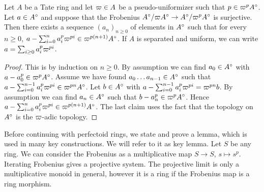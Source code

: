 \begin{lemma}
Let $A$ be a Tate ring and let $\varpi\in A$ be a pseudo-uniformizer such that $p\in\varpi^{p}A{^{\circ}}$. Let $a\in A{^{\circ}}$ and suppose that the Frobenius $A{^{\circ}}/\varpi A{^{\circ}}\to A{^{\circ}}/\varpi^pA{^{\circ}}$ is surjective.
Then there exists a sequence $(a_n)_{n\geq0}$ of elements in $A{^{\circ}}$ such that  for every $n\geq0$,
 $a-\sum_{i=0}^{n}a_i^p\varpi^{pi}\in\varpi^{p(n+1)}A{^{\circ}}$. 
If $A$ is separated and uniform, we can write $a=\sum_{i\geq0}a_i^p\varpi^{pi}$.
\end{lemma}
\begin{proof}
This is by induction on $n\geq0$. By assumption we can find $a_0\in A{^{\circ}}$ with $a-a_0^p\in\varpi^pA{^{\circ}}$.
Assume we have found $a_0\dots a_{n-1}\in A{^{\circ}}$ such that $a-\sum_{i=0}^{n-1}a_i^p\varpi^{pi}\in\varpi^{pn}A{^{\circ}}$. Let $b\in A{^{\circ}}$ with $a-\sum_{i=0}^{n-1}a_i^p\varpi^{pi} = \varpi^{pn}b$.
By assumption we can find $a_n\in A{^{\circ}}$ such that $b-a_n^p\in\varpi^pA{^{\circ}}$.
Hence $a-\sum_{i=0}^{n}a_i^p\varpi^{pi}\in\varpi^{p(n+1)}A{^{\circ}}$.
The last claim uses the fact that the topology on $A{^{\circ}}$
is the $\varpi$-adic topology.
\end{proof}

Before continuing with perfectoid rings, we state and prove a lemma, which is used in many key constructions. We will refer to it as key lemma.
Let $S$ be any ring. We can consider the Frobenius as a multiplicative map $S\to S$, $s\mapsto s^p$. Iterating Frobenius gives a projective system. The projective limit is only a multiplicative monoid in general, however it is a ring if the Frobenius map is a ring morphism.

